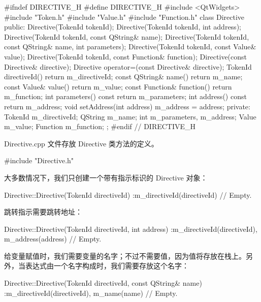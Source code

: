 \begin{codebox}
#ifndef DIRECTIVE_H
#define DIRECTIVE_H
#include <QtWidgets>
#include "Token.h"
#include "Value.h"
#include "Function.h"
class Directive {
  public:
    Directive(TokenId tokenId);
    Directive(TokenId tokenId, int address);
    Directive(TokenId tokenId, const QString& name);
    Directive(TokenId tokenId, const QString& name,
              int parameters);
    Directive(TokenId tokenId, const Value& value);
    Directive(TokenId tokenId, const Function& function);
    Directive(const Directive& directive);
    Directive operator=(const Directive& directive);
    TokenId directiveId() {return m_directiveId;}
    const QString& name() {return m_name;}
    const Value& value() {return m_value;}
    const Function& function() {return m_function;}
    int parameters() const {return m_parameters;}
    int address() const {return m_address;}
    void setAddress(int address) {m_address = address;}
  private:
    TokenId m_directiveId;
    QString m_name;
    int m_parameters, m_address;
    Value m_value;
    Function m_function;
};
#endif // DIRECTIVE_H
\end{codebox}

Directive.cpp 文件存放 Directive 类方法的定义。

\medskip{}

\begin{codebox}
#include "Directive.h"
\end{codebox}

大多数情况下，我们只创建一个带有指示标识的 Directive 对象：

\begin{codebox}
Directive::Directive(TokenId directiveId)
 :m_directiveId(directiveId) {
  // Empty.
}
\end{codebox}

跳转指示需要跳转地址：

\begin{codebox}
Directive::Directive(TokenId directiveId, int address)
 :m_directiveId(directiveId),
  m_address(address) {
  // Empty.
}
\end{codebox}

给变量赋值时，我们需要变量的名字；不过不需要值，因为值将存放在栈上。另外，当表达式由一个名字构成时，我们需要存放这个名字：

\begin{codebox}
Directive::Directive(TokenId directiveId, const QString& name)
 :m_directiveId(directiveId),
  m_name(name) {
  // Empty.
}
\end{codebox}

